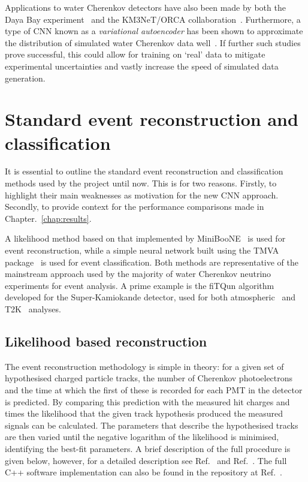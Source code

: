 Applications to water Cherenkov detectors have also been made by both the Daya Bay
experiment~\cite{racah2016} and the KM3NeT/ORCA collaboration~\cite{aiello2020}. Furthermore, a
type of CNN known as a \emph{variational autoencoder} has been shown to approximate the
distribution of simulated water Cherenkov data well~\cite{abhishek2019}. If further such studies
prove successful, this could allow for training on `real' data to mitigate experimental
uncertainties and vastly increase the speed of simulated data generation.

\section{Standard event reconstruction and classification} %
\label{sec:cnn_old} %

It is essential to outline the standard event reconstruction and classification methods used by
the \chips project until now. This is for two reasons. Firstly, to highlight their main weaknesses
as motivation for the new CNN approach. Secondly, to provide context for the performance
comparisons made in Chapter.~\ref{chap:results}.

A likelihood method based on that implemented by MiniBooNE~\cite{patterson2009} is used for event
reconstruction, while a simple neural network built using the TMVA package~\cite{hocker2007} is
used for event classification. Both methods are representative of the mainstream approach used by
the majority of water Cherenkov neutrino experiments for event analysis. A prime example is the
fiTQun algorithm developed for the Super-Kamiokande detector, used for both
atmospheric~\cite{jiang2019} and T2K~\cite{missert2017} analyses.

\subsection{Likelihood based reconstruction} %
\label{sec:cnn_old_reco} %

The event reconstruction methodology is simple in theory: for a given set of hypothesised charged
particle tracks, the number of Cherenkov photoelectrons and the time at which the first of these
is recorded for each PMT in the detector is predicted. By comparing this prediction with the
measured hit charges and times the likelihood that the given track hypothesis produced the
measured signals can be calculated. The parameters that describe the hypothesised tracks are then
varied until the negative logarithm of the likelihood is minimised, identifying the best-fit
parameters. A brief description of the full procedure is given below, however, for a detailed
description see Ref.~\cite{blake2016} and Ref.~\cite{perch2017}. The full C++ software
implementation can also be found in the repository at Ref.~\cite{chipsreco2020}.

